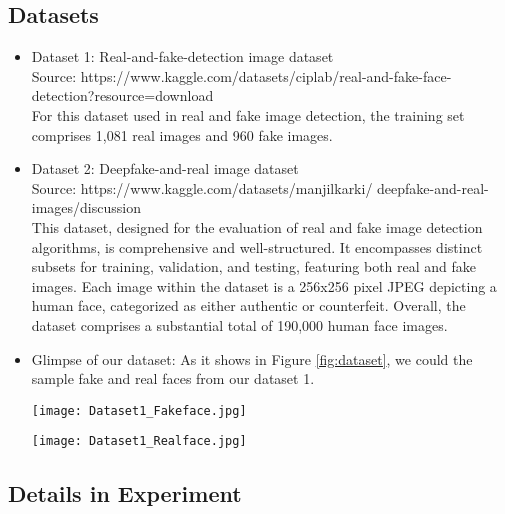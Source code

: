 \documentclass[rebuttal]{cvpr}
\begin{document}
\subsection{Datasets}
\begin{itemize}
    \item Dataset 1: Real-and-fake-detection image dataset  \\
    Source: https://www.kaggle.com/datasets/ciplab/real-and-fake-face-detection?resource=download \\
    For this dataset used in real and fake image detection, the training set comprises 1,081 real images and 960 fake images.
    \item Dataset 2: Deepfake-and-real image dataset  \\
    Source: https://www.kaggle.com/datasets/manjilkarki/
    deepfake-and-real-images/discussion \\
    This dataset, designed for the evaluation of real and fake image detection algorithms, is comprehensive and well-structured. It encompasses distinct subsets for training, validation, and testing, featuring both real and fake images. Each image within the dataset is a 256x256 pixel JPEG depicting a human face, categorized as either authentic or counterfeit. Overall, the dataset comprises a substantial total of 190,000 human face images.

    \item Glimpse of our dataset: As it shows in Figure \ref{fig:dataset}, we could the sample fake and real faces from our dataset 1.
    
\begin{figure*}[t]
\centering
\begin{minipage}{0.45\linewidth}
   \texttt{[image: Dataset1\_Fakeface.jpg]}
   \label{fig:image1}
\end{minipage}
\hfill
\begin{minipage}{0.45\linewidth}
   \texttt{[image: Dataset1\_Realface.jpg]}
   \label{fig:image2}
\end{minipage}
\caption{Glimpse of the dataset}
\label{fig:dataset}
\end{figure*}
\end{itemize}


\subsection{Details in Experiment}
\end{document}

